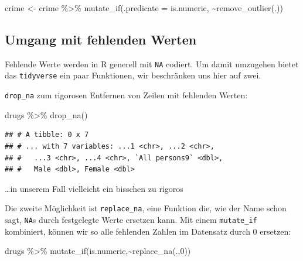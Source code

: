 \documentclass[
]{book}
\newenvironment{Shaded}{\begin{snugshade}}{\end{snugshade}}
\newcommand{\AttributeTok}[1]{\textcolor[rgb]{0.77,0.63,0.00}{#1}}
\newcommand{\DecValTok}[1]{\textcolor[rgb]{0.00,0.00,0.81}{#1}}
\newcommand{\FunctionTok}[1]{\textcolor[rgb]{0.00,0.00,0.00}{#1}}
\newcommand{\NormalTok}[1]{#1}
\newcommand{\OtherTok}[1]{\textcolor[rgb]{0.56,0.35,0.01}{#1}}
\newcommand{\SpecialCharTok}[1]{\textcolor[rgb]{0.00,0.00,0.00}{#1}}
\begin{document}
\begin{Shaded}
\begin{Highlighting}[]
\NormalTok{crime }\OtherTok{\textless{}{-}}\NormalTok{ crime }\SpecialCharTok{\%\textgreater{}\%} 
  \FunctionTok{mutate\_if}\NormalTok{(}\AttributeTok{.predicate =}\NormalTok{ is.numeric,}
            \SpecialCharTok{\textasciitilde{}}\FunctionTok{remove\_outlier}\NormalTok{(.))}
\end{Highlighting}
\end{Shaded}

\hypertarget{umgang-mit-fehlenden-werten}{%
\subsection{Umgang mit fehlenden Werten}\label{umgang-mit-fehlenden-werten}}

Fehlende Werte werden in R generell mit \texttt{NA} codiert. Um damit umzugehen bietet das \texttt{tidyverse} ein paar Funktionen, wir beschränken uns hier auf zwei.

\texttt{drop\_na} zum rigorosen Entfernen von Zeilen mit fehlenden Werten:

\begin{Shaded}
\begin{Highlighting}[]
\NormalTok{drugs }\SpecialCharTok{\%\textgreater{}\%} 
  \FunctionTok{drop\_na}\NormalTok{()}
\end{Highlighting}
\end{Shaded}

\begin{verbatim}
## # A tibble: 0 x 7
## # ... with 7 variables: ...1 <chr>, ...2 <chr>,
## #   ...3 <chr>, ...4 <chr>, `All persons9` <dbl>,
## #   Male <dbl>, Female <dbl>
\end{verbatim}

\ldots in unserem Fall vielleicht ein bisschen zu rigoros

Die zweite Möglichkeit ist \texttt{replace\_na}, eine Funktion die, wie der Name schon sagt, \texttt{NA}s durch festgelegte Werte ersetzen kann. Mit einem \texttt{mutate\_if} kombiniert, können wir so alle fehlenden Zahlen im Datensatz durch 0 ersetzen:

\begin{Shaded}
\begin{Highlighting}[]
\NormalTok{drugs }\SpecialCharTok{\%\textgreater{}\%} 
  \FunctionTok{mutate\_if}\NormalTok{(is.numeric,}\SpecialCharTok{\textasciitilde{}}\FunctionTok{replace\_na}\NormalTok{(.,}\DecValTok{0}\NormalTok{))}
\end{Highlighting}
\end{Shaded}
\end{document}
